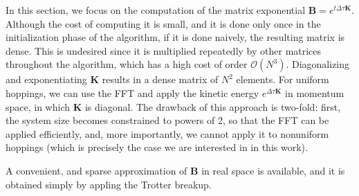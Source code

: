 In this section, we focus on the computation of the matrix exponential $\bm B = e^{t \Delta \tau \bm K}$.
Although the cost of computing it is small, and it is done only once in the initialization phase of the algorithm, if it is done naively, the resulting matrix is dense.
This is undesired since it is multiplied repeatedly by other matrices throughout the algorithm, which has a high cost of order $\mathcal{O}(N^3)$.
Diagonalizing and exponentiating $\bm K$ results in a dense matrix of $N^2$ elements.
For uniform hoppings, we can use the \ac{FFT} and apply the kinetic energy $e^{\Delta \tau \bm K }$ in momentum space, in which $\bm K$ is diagonal.
The drawback of this approach is two-fold: first, the system size becomes constrained to powers of 2, so that the \ac{FFT} can be applied efficiently, and, more importantly, we cannot apply it to nonuniform hoppings (which is precisely the case we are interested in in this work).

A convenient, and sparse approximation of $\bm B$ in real space is available, and it is obtained simply by appling the Trotter breakup.
